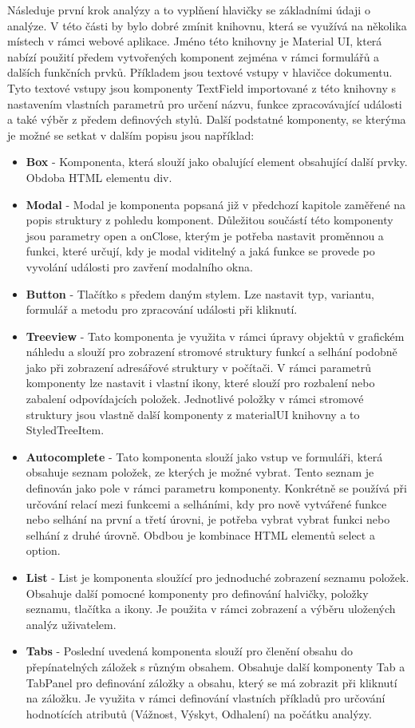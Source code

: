 Následuje první krok analýzy a to vyplňení hlavičky se základními údaji o analýze. V této části by bylo dobré zmínit knihovnu, která se využívá na několika místech v rámci webové aplikace. Jméno této knihovny je Material UI\cite{mui}, která nabízí použití předem vytvořených komponent zejména v rámci formulářů a dalších funkčních prvků. Příkladem jsou textové vstupy v hlavičce dokumentu. Tyto textové vstupy jsou komponenty TextField importované z této knihovny s nastavením vlastních parametrů pro určení názvu, funkce zpracovávající události a také výběr z předem definových stylů. Další podstatné komponenty, se kterýma je možné se setkat v dalším popisu jsou například: 
\begin{itemize}
    \item \textbf{Box} - Komponenta, která slouží jako obalující element obsahující další prvky. Obdoba HTML elementu div.
    \item \textbf{Modal} - Modal je komponenta popsaná již v předchozí kapitole zaměřené na popis struktury z pohledu komponent. Důležitou součástí této komponenty jsou parametry open a onClose, kterým je potřeba nastavit proměnnou a funkci, které určují, kdy je modal viditelný a jaká funkce se provede po vyvolání události pro zavření modalního okna.  
    \item \textbf{Button} - Tlačítko s předem daným stylem. Lze nastavit typ, variantu, formulář a metodu pro zpracování události při kliknutí. 
    \item \textbf{Treeview} - Tato komponenta je využita v rámci úpravy objektů v grafickém náhledu a slouží pro zobrazení stromové struktury funkcí a selhání podobně jako při zobrazení adresářové struktury v počítači. V rámci parametrů komponenty lze nastavit i vlastní ikony, které slouží pro rozbalení nebo zabalení odpovídajcích položek. Jednotlivé položky v rámci stromové struktury jsou vlastně další komponenty z materialUI knihovny a to StyledTreeItem.
    \item \textbf{Autocomplete} - Tato komponenta slouží jako vstup ve formuláři, která obsahuje seznam položek, ze kterých je možné vybrat. Tento seznam je definován jako pole v rámci parametru komponenty. Konkrétně se používá při určování relací mezi funkcemi a selháními, kdy pro nově vytvářené funkce nebo selhání na první a třetí úrovni, je potřeba vybrat vybrat funkci nebo selhání z druhé úrovně. Obdbou je kombinace HTML elementů select a option. 
    \item \textbf{List} - List je komponenta sloužící pro jednoduché zobrazení seznamu položek. Obsahuje další pomocné komponenty pro definování halvičky, položky seznamu, tlačítka a ikony. Je použita v rámci zobrazení a výběru uložených analýz uživatelem. 
    \item \textbf{Tabs} - Poslední uvedená komponenta slouží pro členění obsahu do přepínatelných záložek s různým obsahem. Obsahuje další komponenty Tab a TabPanel pro definování záložky a obsahu, který se má zobrazit při kliknutí na záložku. Je využita v rámci definování vlastních příkladů pro určování hodnotících atributů (Vážnost, Výskyt, Odhalení) na počátku analýzy. 
\end{itemize}

